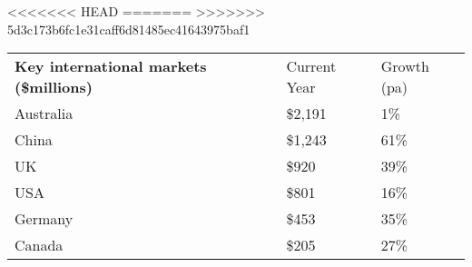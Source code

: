 <<<<<<< HEAD
=======
>>>>>>> 5d3c173b6fc1e31caff6d81485ec41643975baf1
\begin{tabular}[t]{p{4.85cm}>{\hfill}p{1.3cm}>{\hfill}p{1.35cm}}
 \textbf{Key international markets (\$millions)} & Current Year & Growth (pa) \\ 
 Australia & \$2,191 & 1\% \\ 
  China & \$1,243 & 61\% \\ 
  UK & \$920   & 39\% \\ 
  USA & \$801   & 16\% \\ 
  Germany & \$453   & 35\% \\ 
  Canada & \$205   & 27\% \\ 
  \end{tabular}
